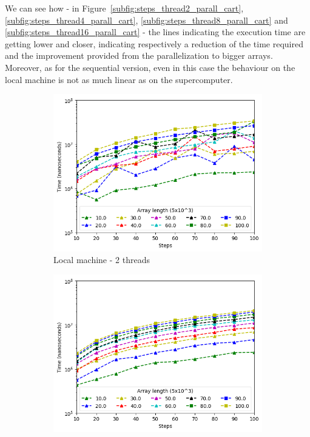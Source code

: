 \documentclass[a4paper]{article}
\begin{document}
We can see how - in Figure~\ref{subfig:steps_thread2_parall_cart}, \ref{subfig:steps_thread4_parall_cart}, \ref{subfig:steps_thread8_parall_cart} and \ref{subfig:steps_thread16_parall_cart} - the lines indicating the execution time are getting lower and closer, indicating respectively a reduction of the time required and the improvement provided from the parallelization to bigger arrays. Moreover, as for the sequential version, even in this case the behaviour on the local machine is not as much linear as on the supercomputer.


\begin{figure}[htbp]
\centering
\begin{subfigure}{.42\textwidth}
  \centering
  \includegraphics[width=\linewidth]{res/parallel/array_thread_2_steps_res.png}
  \caption{Local machine - 2 threads}
  \label{subfig:steps_thread2_parall}
\end{subfigure}%
\begin{subfigure}{.42\textwidth}
  \centering
  \includegraphics[width=\linewidth]{res/parallel/array_thread_2_steps_res_cartesius.png}

\end{subfigure}
\end{figure}
\end{document}
